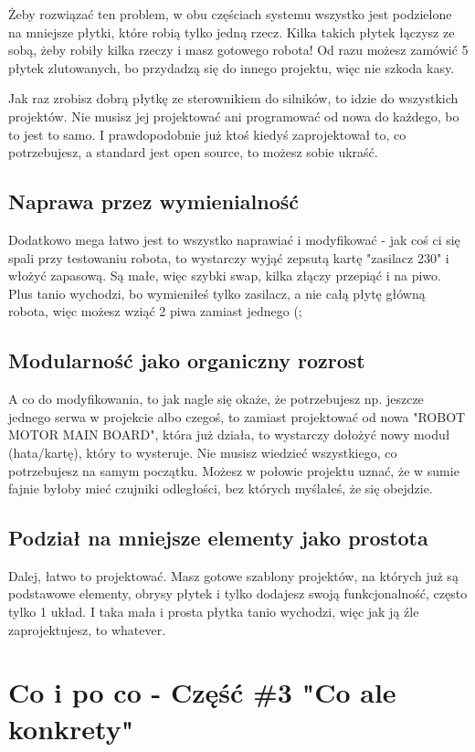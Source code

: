 \documentclass[b5paper, 10pt, twoside]{book}
\begin{document}
Żeby rozwiązać ten problem, w obu częściach systemu wszystko jest podzielone na mniejsze płytki, które robią tylko jedną rzecz. Kilka takich płytek
łączysz ze sobą, żeby robiły kilka rzeczy i masz gotowego robota! Od razu możesz zamówić 5 płytek zlutowanych, bo przydadzą się do innego projektu, więc nie szkoda kasy.

Jak raz zrobisz dobrą płytkę ze sterownikiem do silników, to idzie do wszystkich projektów. Nie musisz jej projektować ani programować od nowa do każdego, bo to jest to samo. I prawdopodobnie już ktoś kiedyś zaprojektował to, co potrzebujesz, a standard jest open source, to możesz sobie ukraść.

\subsection{Naprawa przez wymienialność}
Dodatkowo mega łatwo jest to wszystko naprawiać i modyfikować - jak coś ci się spali przy testowaniu robota, to wystarczy wyjąć zepsutą kartę "zasilacz 230" i włożyć zapasową. Są małe, więc szybki swap, kilka złączy przepiąć i na piwo. Plus tanio wychodzi, bo wymieniłeś tylko zasilacz, a nie całą płytę główną robota, więc możesz wziąć 2 piwa zamiast jednego (;

\subsection{Modularność jako organiczny rozrost}
A co do modyfikowania, to jak nagle się okaże, że potrzebujesz np. jeszcze jednego serwa w projekcie albo czegoś, to zamiast projektować od nowa "ROBOT MOTOR MAIN BOARD", która już działa, to wystarczy dołożyć nowy moduł (hata/kartę), który to wysteruje. Nie musisz wiedzieć wszystkiego, co potrzebujesz na samym początku. Możesz w połowie projektu uznać, że w sumie fajnie byłoby mieć czujniki odległości, bez których myślałeś, że się obejdzie.

\subsection{Podział na mniejsze elementy jako prostota}
Dalej, łatwo to projektować. Masz gotowe szablony projektów, na których już są podstawowe elementy, obrysy płytek i tylko dodajesz swoją funkcjonalność, często tylko 1 układ. I taka mała i prosta płytka tanio wychodzi, więc jak ją źle zaprojektujesz, to whatever.

\newpage
\section{Co i po co - Część \#3 "Co ale konkrety"}
\end{document}
